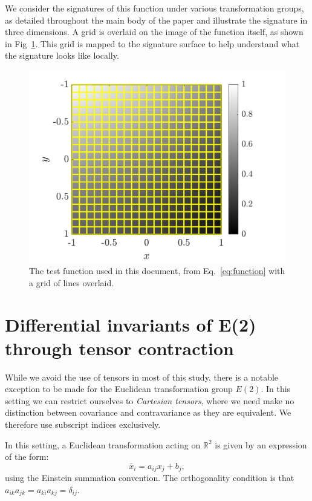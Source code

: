 \documentclass[review,onefignum,onetabnum]{siamonline190516}
\begin{document}
{We consider the signatures of this function under various transformation
groups, as detailed throughout the main body of the paper and illustrate
the signature in three dimensions. A grid is overlaid on the image of the
function itself, as shown in Fig~\ref{fig:function_scanlines}. This grid is
mapped to the signature surface to help understand what the signature looks
like locally.
\begin{figure}
  \centering
  \includegraphics[width=12cm]{Figs/function_scanlines}
  \caption{The test function used in this document, from
  Eq.~\eqref{eq:function} with a grid of lines
overlaid.}\label{fig:function_scanlines}
\end{figure}


\section{Differential invariants of E(2) through tensor contraction}
While we avoid the use of tensors in most of this study, there is a notable exception to be made for the Euclidean transformation group $E(2)$. In this setting we can restrict ourselves to \emph{Cartesian tensors}, where we need make no distinction between covariance and contravariance as they are equivalent. We therefore use subscript indices exclusively.

In this setting, a Euclidean transformation acting on $\mathbb{R}^2$ is given
by an expression of the form:
\begin{equation*}
  \bar{x}_i = a_{ij}x_j + b_j,
\end{equation*}
using the Einstein summation convention. The orthogonality condition is that $a_{ik}a_{jk} = a_{ki}a_{kj} = \delta_{ij}$.

}
\end{document}

